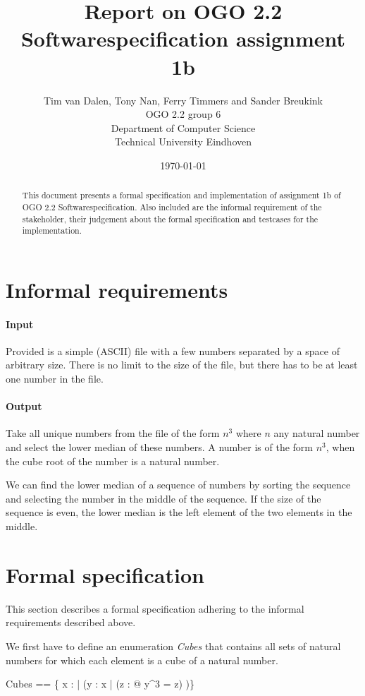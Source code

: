 \documentclass[12pt]{article}
\title{Report on OGO 2.2 Softwarespecification assignment 1b}
\author{
        Tim van Dalen, Tony Nan, Ferry Timmers and Sander Breukink\\ OGO 2.2 group 6 \\
                Department of Computer Science\\
        Technical University Eindhoven\\
}
\date{\today}
\begin{document}
\maketitle

\begin{abstract}
This document presents a formal specification and implementation of assignment 1b of OGO 2.2 Softwarespecification. Also included are the informal requirement of the stakeholder, their judgement about the formal specification and testcases for the implementation.
\end{abstract}

\section{Informal requirements}
\paragraph{Input} Provided is a simple (ASCII) file with a few numbers separated by a space of arbitrary size. There is no limit to the size of the file, but there has to be at least one number in the file.

\paragraph{Output} Take all unique numbers from the file of the form $n^3$ where $n$ any natural number and select the lower median of these numbers. A number is of the form $n^3$, when the cube root of the number is a natural number.

We can find the lower median of a sequence of numbers by sorting the sequence and selecting the number in the middle of the sequence. If the size of the sequence is even, the lower median is the left element of the two elements in the middle.

\section{Formal specification}

This section describes a formal specification adhering to the informal requirements described above.

We first have to define an enumeration \textit{Cubes} that contains all sets of natural numbers for which each element is a cube of a natural number.
\begin{axdef}
Cubes == \{ x : \power \nat | (\forall y : x | (\exists z : \nat @ y^3 = z) )\}
\end{axdef}
\end{document}
